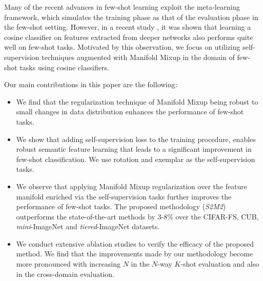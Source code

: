 \documentclass[10pt,twocolumn,letterpaper]{article}
\begin{document}
Many of the recent advances in few-shot learning exploit the meta-learning framework, which simulates the training phase as that of the evaluation phase in the few-shot setting.
However, in a recent study \cite{chen2019closerfewshot}, it was shown that learning a cosine classifier on features extracted from deeper networks also performs quite well on few-shot tasks. Motivated by this observation, we focus on utilizing self-supervision techniques augmented with Manifold Mixup in the domain of few-shot tasks using cosine classifiers.





Our main contributions in this paper are the following: 
\begin{itemize}
    










    \item We find that the regularization technique of Manifold Mixup \cite{verma2019manifold} being robust to small changes in data distribution enhances the performance of few-shot tasks.
    
    \item We show that adding self-supervision loss to the training procedure, enables robust semantic feature learning that leads to a significant improvement in few-shot classification. We use rotation \cite{Spyros2018rotate} and exemplar \cite{exemplar2014} as the self-supervision tasks.

    \item We observe that applying Manifold Mixup regularization over the feature manifold enriched via the self-supervision tasks further improves the performance of few-shot tasks. The proposed methodology (\textit{S2M2}) outperforms the state-of-the-art methods by 3-8\% over the CIFAR-FS, CUB, \textit{mini}-ImageNet and {\textit{tiered}-ImageNet} datasets.
    
    \item We conduct extensive ablation studies to verify the efficacy of the proposed method. We find that the improvements made by our methodology become more pronounced with increasing $N$ in the $N$-way $K$-shot evaluation and also
    in the cross-domain evaluation.
    
\end{itemize}
\end{document}
